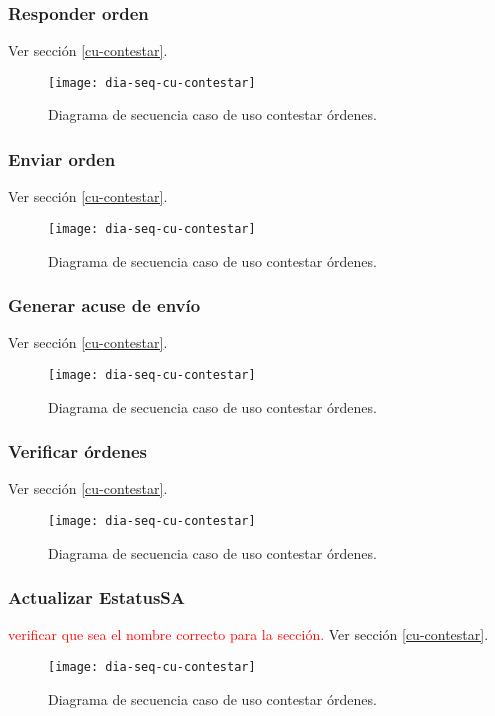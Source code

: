 \subsubsection{Responder orden}
Ver sección \ref{cu-contestar}.\\
\begin{figure}[h]
	\centering
	\texttt{[image: dia-seq-cu-contestar]}
	\caption{Diagrama de secuencia caso de uso contestar órdenes.}
	\label{fig:dia-seq-cu-contestar}
\end{figure}
\subsubsection{Enviar orden}
Ver sección \ref{cu-contestar}.\\
\begin{figure}[h]
	\centering
	\texttt{[image: dia-seq-cu-contestar]}
	\caption{Diagrama de secuencia caso de uso contestar órdenes.}
	\label{fig:dia-seq-cu-contestar}
\end{figure}
\subsubsection{Generar acuse de envío}
Ver sección \ref{cu-contestar}.\\
\begin{figure}[h]
	\centering
	\texttt{[image: dia-seq-cu-contestar]}
	\caption{Diagrama de secuencia caso de uso contestar órdenes.}
	\label{fig:dia-seq-cu-contestar}
\end{figure}
\subsubsection{Verificar órdenes}
Ver sección \ref{cu-contestar}.\\
\begin{figure}[h]
	\centering
	\texttt{[image: dia-seq-cu-contestar]}
	\caption{Diagrama de secuencia caso de uso contestar órdenes.}
	\label{fig:dia-seq-cu-contestar}
\end{figure}
\subsubsection{Actualizar EstatusSA}
\textcolor{red}{verificar que sea el nombre correcto para la sección.}
Ver sección \ref{cu-contestar}.\\
\begin{figure}[h]
	\centering
	\texttt{[image: dia-seq-cu-contestar]}
	\caption{Diagrama de secuencia caso de uso contestar órdenes.}
	\label{fig:dia-seq-cu-contestar}
\end{figure}
